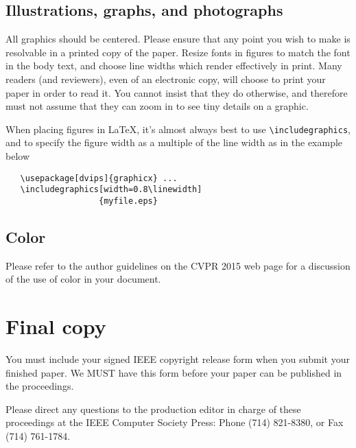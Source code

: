 \documentclass[10pt,twocolumn,letterpaper]{article}
\begin{document}
\subsection{Illustrations, graphs, and photographs}

All graphics should be centered.  Please ensure that any point you wish to
make is resolvable in a printed copy of the paper.  Resize fonts in figures
to match the font in the body text, and choose line widths which render
effectively in print.  Many readers (and reviewers), even of an electronic
copy, will choose to print your paper in order to read it.  You cannot
insist that they do otherwise, and therefore must not assume that they can
zoom in to see tiny details on a graphic.

When placing figures in \LaTeX, it's almost always best to use
\verb+\includegraphics+, and to specify the  figure width as a multiple of
the line width as in the example below
{\small\begin{verbatim}
   \usepackage[dvips]{graphicx} ...
   \includegraphics[width=0.8\linewidth]
                   {myfile.eps}
\end{verbatim}
}


\subsection{Color}

Please refer to the author guidelines on the CVPR 2015 web page for a discussion
of the use of color in your document.

\section{Final copy}

You must include your signed IEEE copyright release form when you submit
your finished paper. We MUST have this form before your paper can be
published in the proceedings.

Please direct any questions to the production editor in charge of these
proceedings at the IEEE Computer Society Press: Phone (714) 821-8380, or
Fax (714) 761-1784.

{\small


}
\end{document}
